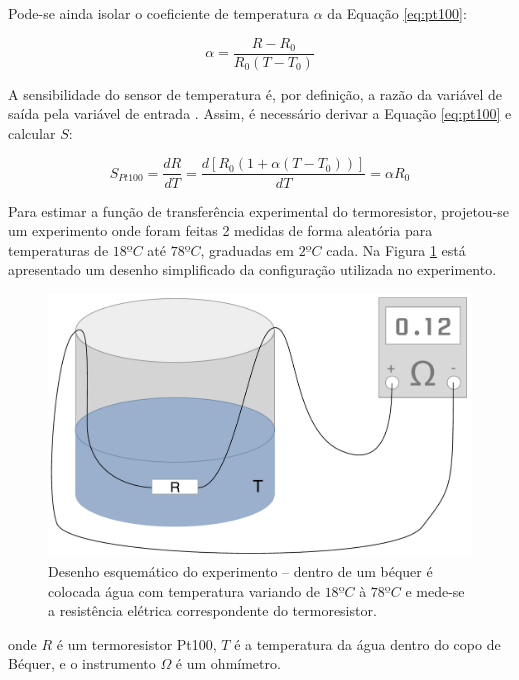\documentclass[a4paper]{instrumentacao}
\begin{document}
Pode-se ainda isolar o coeficiente de temperatura $\alpha$ da Equação \ref{eq:pt100}:

\begin{equation}
	\alpha=\frac{R-R_0}{R_0(T-T_0)}
	\label{eq:pt100-alpha}
\end{equation}

A sensibilidade do sensor  de temperatura é, por definição, a razão da variável de saída pela variável de entrada \cite{livro-texto}. Assim, é necessário derivar a Equação \ref{eq:pt100} e calcular $S$:

\begin{equation}
	S_{Pt100}=\frac{dR}{dT}=\frac{d[R_0(1+\alpha(T-T_0))]}{dT}=\alpha R_0
	\label{eq:pt100-sensibilidade}
\end{equation}

Para estimar a função de transferência experimental do termoresistor, projetou-se um experimento onde foram feitas 2 medidas de forma aleatória para temperaturas de $18ºC$ até $78ºC$, graduadas em $2ºC$ cada. Na Figura \ref{fig:pt100-esquematico} está apresentado um desenho simplificado da configuração utilizada no experimento.

\begin{figure}[H]
\center
\includegraphics[width=\textwidth]{Bequer.pdf}
\caption{Desenho esquemático do experimento -- dentro de um béquer é colocada água com temperatura variando de $18ºC$ à $78ºC$ e mede-se a resistência elétrica correspondente do termoresistor.}
\label{fig:pt100-esquematico}
\end{figure}

\noindent
onde $R$ é um termoresistor Pt100, $T$ é a temperatura da água dentro do copo de Béquer, e o instrumento $\Omega$ é um ohmímetro.
\end{document}
